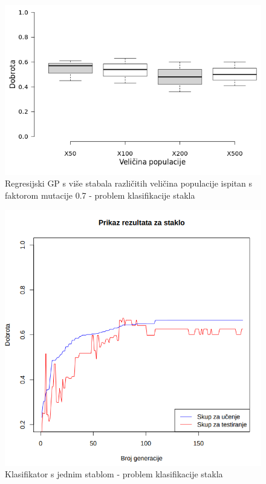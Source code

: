 \documentclass[times, utf8, zavrsni]{fer}
\begin{document}
\begin{figure}[htb]
\centering
\includegraphics[scale=0.5]{grafovi/boxplotGlassM}
\caption{Regresijski GP s više stabala različitih veličina populacije ispitan s faktorom mutacije 0.7 - problem klasifikacije stakla}
\end{figure}

\begin{figure}[htb]
\centering
\includegraphics[scale=0.45]{grafovi/staklo1-3}
\caption{Klasifikator s jednim stablom - problem klasifikacije stakla}
\end{figure}
\end{document}
